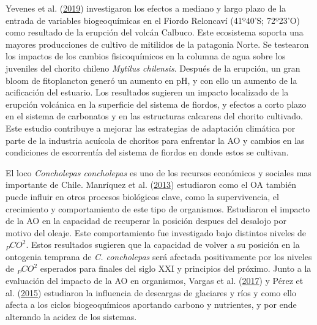 \documentclass[
]{article}
\begin{document}
Yevenes et al. (\protect\hyperlink{ref-Yevenes2019}{2019}) investigaron
los efectos a mediano y largo plazo de la entrada de variables
biogeoquímicas en el Fiordo Reloncaví (41º40'S; 72º23'O) como resultado
de la erupción del volcán Calbuco. Este ecosistema soporta una mayores
producciones de cultivo de mitilidos de la patagonia Norte. Se testearon
los impactos de los cambios fisicoquímicos en la columna de agua sobre
los juveniles del chorito chileno \emph{Mytilus chilensis}. Después de
la erupción, un gran bloom de fitoplancton generó un aumento en pH, y
con ello un aumento de la acificación del estuario. Los resultados
sugieren un impacto localizado de la erupción volcánica en la superficie
del sistema de fiordos, y efectos a corto plazo en el sistema de
carbonatos y en las estructuras calcareas del chorito cultivado. Este
estudio contribuye a mejorar las estrategias de adaptación climática por
parte de la industria acuícola de choritos para enfrentar la AO y
cambios en las condiciones de escorrentía del sistema de fiordos en
donde estos se cultivan.

El loco \emph{Concholepas concholepas} es uno de los recursos económicos
y sociales mas importante de Chile. Manríquez et al.
(\protect\hyperlink{ref-Manriquez2013}{2013}) estudiaron como el OA
también puede influir en otros procesos biológicos clave, como la
supervivencia, el crecimiento y comportamiento de este tipo de
organismos. Estudiaron el impacto de la AO en la capacidad de recuperar
la posición despues del desalojo por motivo del oleaje. Este
comportamiento fue investigado bajo distintos niveles de \(_PCO^2\).
Estos resultados sugieren que la capacidad de volver a su posición en la
ontogenia temprana de \emph{C. concholepas} será afectada positivamente
por los niveles de \(_PCO^2\) esperados para finales del siglo XXI y
principios del próximo. Junto a la evaluación del impacto de la AO en
organismos, Vargas et al. (\protect\hyperlink{ref-Vargas2017}{2017}) y
Pérez et al. (\protect\hyperlink{ref-Perez2015}{2015}) estudiaron la
influencia de descargas de glaciares y ríos y como ello afecta a los
ciclos biogeoquímicos aportando carbono y nutrientes, y por ende
alterando la acidez de los sistemas.
\end{document}
